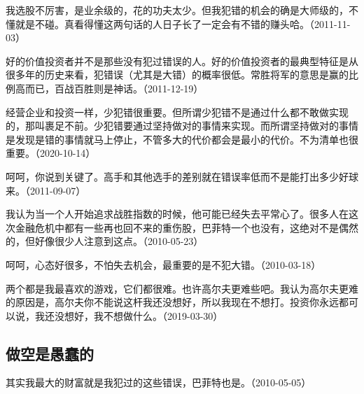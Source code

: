 我选股不厉害，是业余级的，花的功夫太少。但我犯错的机会的确是大师级的，不懂就是不碰。真看得懂这两句话的人日子长了一定会有不错的赚头哈。（2011-11-03）

好的价值投资者并不是那些没有犯过错误的人。好的价值投资者的最典型特征是从很多年的历史来看，犯错误（尤其是大错）的概率很低。常胜将军的意思是赢的比例高而已，百战百胜则是神话。（2011-12-19）

经营企业和投资一样，少犯错很重要。但所谓少犯错不是通过什么都不敢做实现的，那叫裹足不前。少犯错要通过坚持做对的事情来实现。而所谓坚持做对的事情是发现是错的事情就马上停止，不管多大的代价都会是最小的代价。不为清单也很重要。（2020-10-14）


呵呵，你说到关键了。高手和其他选手的差别就在错误率低而不是能打出多少好球来。（2011-09-07）


我认为当一个人开始追求战胜指数的时候，他可能已经失去平常心了。很多人在这次金融危机中都有一些再也回不来的重伤股，巴菲特一个也没有，这绝对不是偶然的，但好像很少人注意到这点。（2010-05-23）


呵呵，心态好很多，不怕失去机会，最重要的是不犯大错。（2010-03-18）


两个都是我最喜欢的游戏，它们都很难。也许高尔夫更难些吧。我认为高尔夫更难的原因是，高尔夫你不能说这杆我还没想好，所以我现在不想打。投资你永远都可以说，我还没想好，我不想做什么。（2019-03-30）

\subsection{做空是愚蠢的}

其实我最大的财富就是我犯过的这些错误，巴菲特也是。（2010-05-05）

